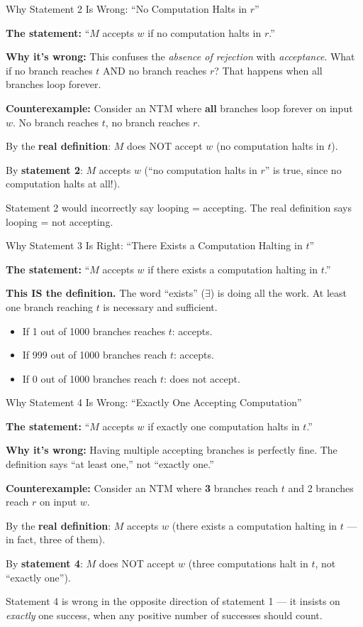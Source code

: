 \begin{examplebox}{Why Statement 2 Is Wrong: ``No Computation Halts in $r$''}

\textbf{The statement:} ``$M$ accepts $w$ if no computation halts in $r$.''

\textbf{Why it's wrong:} This confuses the \emph{absence of rejection} with
\emph{acceptance}. What if no branch reaches $t$ AND no branch reaches $r$?
That happens when all branches loop forever.

\textbf{Counterexample:} Consider an NTM where \textbf{all} branches loop
forever on input $w$. No branch reaches $t$, no branch reaches $r$.

By the \textbf{real definition}: $M$ does NOT accept $w$ (no computation halts
in $t$).

By \textbf{statement 2}: $M$ accepts $w$ (``no computation halts in $r$'' is
true, since no computation halts at all!).

Statement 2 would incorrectly say looping = accepting. The real definition says
looping = not accepting.
\end{examplebox}

\begin{examplebox}{Why Statement 3 Is Right: ``There Exists a Computation Halting in $t$''}

\textbf{The statement:} ``$M$ accepts $w$ if there exists a computation halting
in $t$.''

\textbf{This IS the definition.} The word ``exists'' ($\exists$) is doing all
the work. At least one branch reaching $t$ is necessary and sufficient.
\begin{itemize}[nosep]
\item If 1 out of 1000 branches reaches $t$: accepts.
\item If 999 out of 1000 branches reach $t$: accepts.
\item If 0 out of 1000 branches reach $t$: does not accept.
\end{itemize}
\end{examplebox}

\begin{examplebox}{Why Statement 4 Is Wrong: ``Exactly One Accepting Computation''}

\textbf{The statement:} ``$M$ accepts $w$ if exactly one computation halts in
$t$.''

\textbf{Why it's wrong:} Having multiple accepting branches is perfectly fine.
The definition says ``at least one,'' not ``exactly one.''

\textbf{Counterexample:} Consider an NTM where \textbf{3} branches reach $t$
and 2 branches reach $r$ on input $w$.

By the \textbf{real definition}: $M$ accepts $w$ (there exists a computation
halting in $t$ --- in fact, three of them).

By \textbf{statement 4}: $M$ does NOT accept $w$ (three computations halt in
$t$, not ``exactly one'').

Statement 4 is wrong in the opposite direction of statement 1 --- it insists on
\emph{exactly} one success, when any positive number of successes should count.
\end{examplebox}

